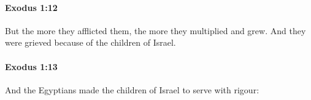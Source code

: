 		\paragraph{Exodus 1:12} %
			\label{EXODUS-1-12}

			But the more they afflicted them, the more they multiplied and grew. And they were grieved because of the children of Israel.


		\paragraph{Exodus 1:13} %
			\label{EXODUS-1-13}

			And the Egyptians made the children of Israel to serve with rigour:


